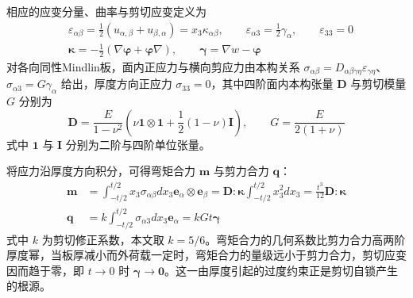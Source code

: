 \documentclass[internationalmaster]{hquThesis}
\begin{document}
相应的应变分量、曲率与剪切应变定义为
\begin{equation}
    \begin{aligned}
        &\varepsilon_{\alpha\beta} = \frac{1}{2} (u_{\alpha,\beta} + u_{\beta,\alpha}) = x_3 \kappa_{\alpha\beta},\qquad
        \varepsilon_{\alpha 3} = \frac{1}{2} \gamma_\alpha,\qquad \varepsilon_{33} = 0\\
        &\boldsymbol \kappa = - \frac{1}{2} (\nabla \boldsymbol \varphi+\boldsymbol \varphi \nabla),\qquad
        \boldsymbol \gamma = \nabla w - \boldsymbol \varphi
    \end{aligned}
    \label{eq:strain}
\end{equation}
对各向同性Mindlin板，面内正应力与横向剪应力由本构关系 $\sigma_{\alpha\beta}=D_{\alpha\beta\gamma\eta}\varepsilon_{\gamma\eta}$、$\sigma_{\alpha 3}=G\gamma_\alpha$ 给出，厚度方向正应力 $\sigma_{33}=0$，其中四阶面内本构张量 $\boldsymbol D$ 与剪切模量 $G$ 分别为
\begin{equation}
    \boldsymbol D = \frac{E}{1-\nu^2} \left (
        \nu \boldsymbol 1\otimes \boldsymbol 1 + \frac{1}{2}(1-\nu) \boldsymbol I
    \right ),\qquad
    G = \frac{E}{2(1+\nu)}
    \label{eq:constitutive}
\end{equation}
式中 $\boldsymbol 1$ 与 $\boldsymbol I$ 分别为二阶与四阶单位张量。

将应力沿厚度方向积分，可得弯矩合力 $\boldsymbol m$ 与剪力合力 $\boldsymbol q$：
\begin{equation}
    \begin{aligned}
        \boldsymbol m &= \int_{-t/2}^{t/2} x_3 \sigma_{\alpha\beta} dx_3 \boldsymbol e_\alpha \otimes \boldsymbol e_\beta
        = \boldsymbol D : \boldsymbol \kappa \int_{-t/2}^{t/2} x_3^2 dx_3
        = \frac{t^3}{12} \boldsymbol D : \boldsymbol \kappa\\
        \boldsymbol q &= k\int_{-t/2}^{t/2} \sigma_{\alpha 3} dx_3 \boldsymbol e_\alpha = kGt \boldsymbol \gamma
    \end{aligned}
    \label{eq:resultants}
\end{equation}
式中 $k$ 为剪切修正系数，本文取 $k=5/6$。弯矩合力的几何系数比剪力合力高两阶厚度幂，当板厚减小而外荷载一定时，弯矩合力的量级远小于剪力合力，剪切应变因而趋于零，即 $t\to0$ 时 $\boldsymbol\gamma\to\boldsymbol 0$。这一由厚度引起的过度约束正是剪切自锁产生的根源。
\end{document}
